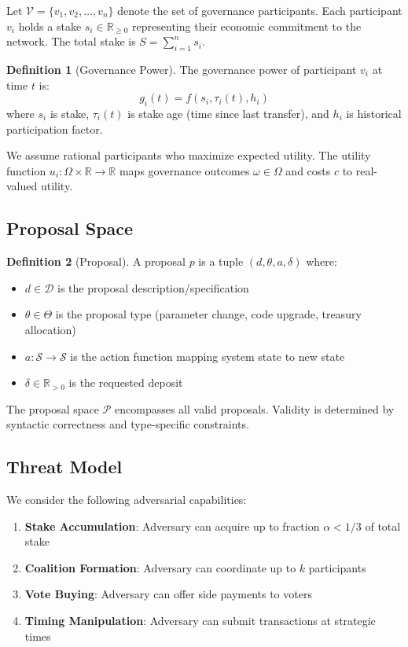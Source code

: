 \documentclass[11pt,a4paper]{article}
\theoremstyle{definition}
\newtheorem{definition}{Definition}[section]
\theoremstyle{remark}
\begin{document}
Let $\mathcal{V} = \{v_1, v_2, \ldots, v_n\}$ denote the set of governance participants. Each participant $v_i$ holds a stake $s_i \in \mathbb{R}_{\geq 0}$ representing their economic commitment to the network. The total stake is $S = \sum_{i=1}^{n} s_i$.

\begin{definition}[Governance Power]
The governance power of participant $v_i$ at time $t$ is:
\begin{equation}
    g_i(t) = f(s_i, \tau_i(t), h_i)
\end{equation}
where $s_i$ is stake, $\tau_i(t)$ is stake age (time since last transfer), and $h_i$ is historical participation factor.
\end{definition}

We assume rational participants who maximize expected utility. The utility function $u_i: \Omega \times \mathbb{R} \to \mathbb{R}$ maps governance outcomes $\omega \in \Omega$ and costs $c$ to real-valued utility.

\subsection{Proposal Space}

\begin{definition}[Proposal]
A proposal $p$ is a tuple $(d, \theta, a, \delta)$ where:
\begin{itemize}
    \item $d \in \mathcal{D}$ is the proposal description/specification
    \item $\theta \in \Theta$ is the proposal type (parameter change, code upgrade, treasury allocation)
    \item $a: \mathcal{S} \to \mathcal{S}$ is the action function mapping system state to new state
    \item $\delta \in \mathbb{R}_{>0}$ is the requested deposit
\end{itemize}
\end{definition}

The proposal space $\mathcal{P}$ encompasses all valid proposals. Validity is determined by syntactic correctness and type-specific constraints.

\subsection{Threat Model}

We consider the following adversarial capabilities:
\begin{enumerate}
    \item \textbf{Stake Accumulation}: Adversary can acquire up to fraction $\alpha < 1/3$ of total stake
    \item \textbf{Coalition Formation}: Adversary can coordinate up to $k$ participants
    \item \textbf{Vote Buying}: Adversary can offer side payments to voters
    \item \textbf{Timing Manipulation}: Adversary can submit transactions at strategic times
\end{enumerate}
\end{document}
